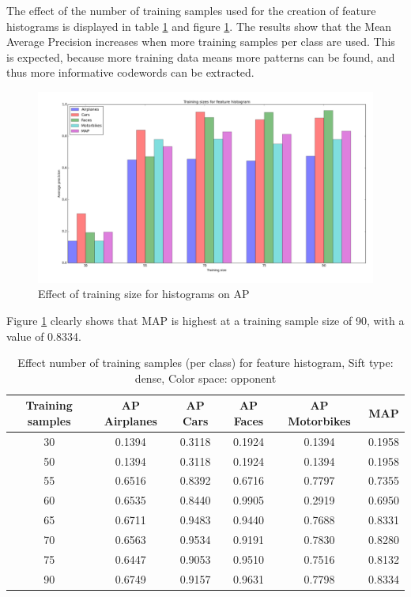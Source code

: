 The effect of the number of training samples used for the creation of feature histograms is displayed in table \ref{tab:size_hist} and figure \ref{fig:size_hist}. The results show that the Mean Average Precision increases when more training samples per class are used. This is expected, because more training data means more patterns can be found, and thus more informative codewords can be extracted.
\begin{figure}[H]
\includegraphics[width=\textwidth]{../plots/training_size_feature_histograms}
\caption{Effect of training size for histograms on AP}
\label{fig:size_hist}
\end{figure}
Figure \ref{fig:size_hist} clearly shows that MAP is highest at a training sample size of 90, with a value of 0.8334.

\begin{table}[H]
\begin{center}
\begin{tabular}{|c|ccccc|}
\hline
\textbf{Training samples} & \textbf{AP Airplanes} & \textbf{AP Cars} & \textbf{AP Faces} & \textbf{AP Motorbikes} & \textbf{MAP}\\
\hline
30 & 0.1394 & 0.3118& 0.1924& 0.1394 & 0.1958\\
50 & 0.1394 & 0.3118& 0.1924& 0.1394 & 0.1958\\
55 & 0.6516 & 0.8392 & 0.6716 & 0.7797 & 0.7355\\
60 & 0.6535 & 0.8440 & 0.9905 & 0.2919 & 0.6950\\
65 & 0.6711 & 0.9483 & 0.9440 & 0.7688 & 0.8331\\
70 & 0.6563 & 0.9534 & 0.9191 & 0.7830 & 0.8280\\
75 & 0.6447 & 0.9053 & 0.9510 & 0.7516 & 0.8132\\
90 & 0.6749 & 0.9157 & 0.9631 & 0.7798 & 0.8334\\
\hline
\end{tabular}
\caption{Effect number of training samples (per class) for feature histogram, Sift type: dense, Color space: opponent}
\label{tab:size_hist}
\end{center}
\end{table}
